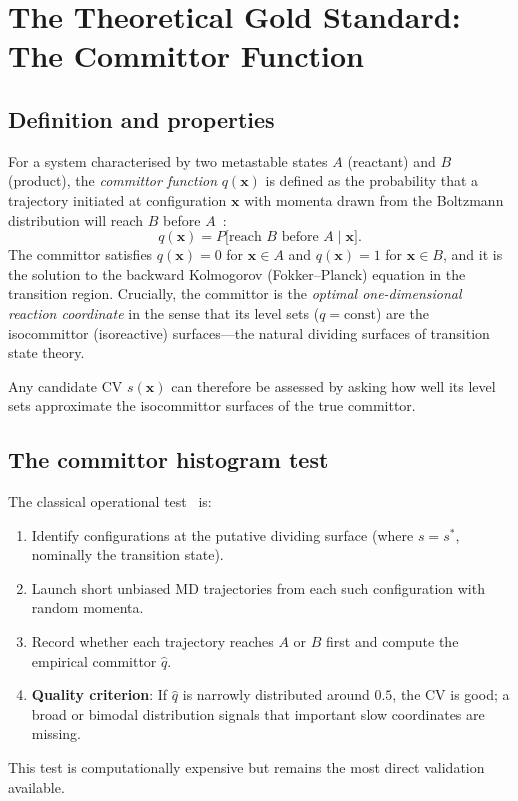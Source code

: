 \documentclass[12pt, a4paper]{article}
\begin{document}
\section{The Theoretical Gold Standard: The Committor Function}
\label{sec:committor}

\subsection{Definition and properties}

For a system characterised by two metastable states $A$ (reactant) and 
$B$ (product), the \emph{committor function} $q(\mathbf{x})$ is defined 
as the probability that a trajectory initiated at configuration 
$\mathbf{x}$ with momenta drawn from the Boltzmann distribution will 
reach $B$ before $A$~\citep{EWainanBerkovitz2004}:
\begin{equation}
  q(\mathbf{x}) = P\bigl[\text{reach }B \text{ before }A \mid \mathbf{x}\bigr].
\end{equation}
The committor satisfies $q(\mathbf{x})=0$ for $\mathbf{x}\in A$ and 
$q(\mathbf{x})=1$ for $\mathbf{x}\in B$, and it is the solution to 
the backward Kolmogorov (Fokker--Planck) equation in the transition 
region.  Crucially, the committor is the \emph{optimal one-dimensional 
reaction coordinate} in the sense that its level sets ($q=\text{const}$) 
are the isocommittor (isoreactive) surfaces---the natural dividing 
surfaces of transition state theory.

Any candidate CV $s(\mathbf{x})$ can therefore be assessed by asking how 
well its level sets approximate the isocommittor surfaces 
of the true committor.

\subsection{The committor histogram test}

The classical operational test~\citep{Du1998,Geissler1999} is:
\begin{enumerate}[noitemsep]
  \item Identify configurations at the putative dividing surface 
        (where $s=s^*$, nominally the transition state).
  \item Launch short unbiased MD trajectories from each such 
        configuration with random momenta.
  \item Record whether each trajectory reaches $A$ or $B$ first and 
        compute the empirical committor $\hat{q}$.
  \item \textbf{Quality criterion}: If $\hat{q}$ is narrowly distributed 
        around $0.5$, the CV is good; a broad or bimodal distribution 
        signals that important slow coordinates are missing.
\end{enumerate}
This test is computationally expensive but remains the most direct 
validation available.
\end{document}
